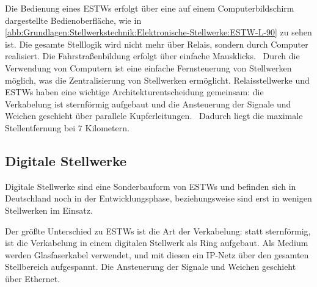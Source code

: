 Die Bedienung eines \acp{ESTW} erfolgt über eine auf einem Computerbildschirm dargestellte Bedienoberfläche, wie in \autoref{abb:Grundlagen:Stellwerkstechnik:Elektronische-Stellwerke:ESTW-L-90} zu sehen ist. Die gesamte Stelllogik wird nicht mehr über Relais, sondern durch Computer realisiert. Die Fahrstraßenbildung erfolgt über einfache Mausklicks.~\cite[][S.200 ff.]{bib:Sicherung-des-Schienenverkehrs} Durch die Verwendung von Computern ist eine einfache Fernsteuerung von Stellwerken möglich, was die Zentralisierung von Stellwerken ermöglicht. Relaisstellwerke und \acp{ESTW} haben eine wichtige Architekturentscheidung gemeinsam: die Verkabelung ist sternförmig aufgebaut und die Ansteuerung der Signale und Weichen geschieht über parallele Kupferleitungen.~\cite[][S.196]{bib:Sicherung-des-Schienenverkehrs} Dadurch liegt die maximale Stellentfernung bei 7 Kilometern.~\cite{bib:DB:Stellwerke}

\subsection{Digitale Stellwerke}\label{text:Grundlagen:Stellwerkstechnik:Digitale-Stellwerke}

Digitale Stellwerke sind eine Sonderbauform von \acp{ESTW} und befinden sich in Deutschland noch in der Entwicklungsphase, beziehungsweise sind erst in wenigen Stellwerken im Einsatz.

Der größte Unterschied zu \acp{ESTW} ist die Art der Verkabelung: statt sternförmig, ist die Verkabelung in einem digitalen Stellwerk als Ring aufgebaut. Als Medium werden Glasfaserkabel verwendet, und mit diesen ein IP-Netz über den gesamten Stellbereich aufgespannt. Die Ansteuerung der Signale und Weichen geschieht über Ethernet.~\cite[][S.196 ff.]{bib:Sicherung-des-Schienenverkehrs}
